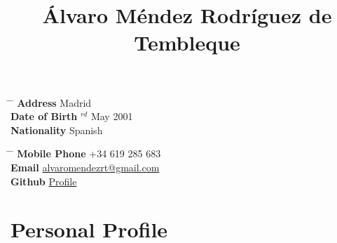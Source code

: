 \documentclass[10pt]{article} %
\begin{document}

\title{Álvaro Méndez Rodríguez de Tembleque } %


\parbox{0.5\textwidth}{ %
  \begin{tabbing} %
    \hspace{3cm} \= \hspace{4cm} \= \kill %
    {\bf Address} \> Madrid\\ %
    {\bf Date of Birth} $^{rd}$ May 2001 \\ %
    {\bf Nationality} \> Spanish %
  \end{tabbing}}
\hfill %
\parbox{0.5\textwidth}{ %
  \begin{tabbing} %
    \hspace{3cm} \= \hspace{4cm} \= \kill %
    {\bf Mobile Phone} \> +34 619 285 683 \\ %
    {\bf Email} \> \href{mailto:alvaromendezrt@gmail.com}{alvaromendezrt@gmail.com} \\ %
    {\bf Github} \> \href{https://github.com/PhyAMR}{Profile} \\ %
  \end{tabbing}}
  \vspace{-5mm}

\section{Personal Profile}
\end{document}
